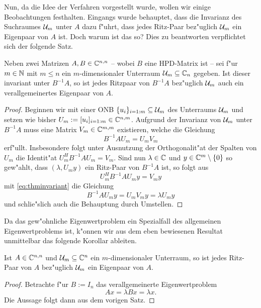 Nun, da die Idee der Verfahren vorgestellt wurde, wollen wir einige Beobachtungen
festhalten. Eingangs wurde behauptet, dass die Invarianz des Suchraumes $\mathcal{U}_m$ unter
$A$ dazu f"uhrt, dass jedes Ritz-Paar bez"uglich $\mathcal{U}_m$ ein Eigenpaar von $A$ ist.
Doch warum ist das so? Dies zu beantworten verpflichtet sich der folgende Satz.

\begin{thm}\label{thm:invariant}
Neben zwei Matrizen $A,B\in\mathbb{C}^{n,n}$ -- wobei $B$ eine HPD-Matrix ist -- sei f"ur
$m\in\mathbb{N}$ mit $m\le n$ ein $m$-dimensionaler Unterraum $\mathcal{U}_m \subseteq \mathbb{C}_n$ gegeben.
Ist dieser invariant unter $B^{-1}A$, so ist jedes Ritzpaar von $B^{-1}A$
bez"uglich $\mathcal{U}_m$ auch ein verallgemeinertes Eigenpaar von $A$.
\end{thm}

\begin{proof}
Beginnen wir mit einer ONB $\{u_i\}_{i=1:m}\subseteq\mathcal{U}_m$ des Unterraums $\mathcal{U}_m$
und setzen wie bisher $U_m := [u_i]_{i=1:m}\in\mathbb{C}^{n,m}$. Aufgrund der Invarianz
von $\mathcal{U}_m$ unter $B^{-1}A$ muss eine Matrix $V_m \in \mathbb{C}^{m,m}$ existieren, welche
die Gleichung
\begin{equation}\label{eq:thminvariant}
B^{-1}A U_m = U_m V_m
\end{equation}
erf"ullt. Insbesondere folgt unter Ausnutzung der Orthogonalit"at der Spalten
von $U_m$ die Identit"at $U_m^H B^{-1}A U_m = V_m$.
Sind nun $\lambda\in\mathbb{C}$ und $y\in\mathbb{C}^m\setminus\{0\}$ so gew"ahlt, dass $(\lambda, U_m y)$
ein Ritz-Paar von $B^{-1}A$ ist, so folgt aus
\[
U_m^H B^{-1}A U_m y = V_m y
\]
mit \eqref{eq:thminvariant} die Gleichung
\[
B^{-1}AU_m y = U_m V_m y = \lambda U_m y
\]
und schlie"slich auch die Behauptung durch Umstellen.
\end{proof}

Da das gew"ohnliche Eigenwertproblem ein Spezialfall des allgemeinen Eigenwertproblems
ist, k"onnen wir aus dem eben bewiesenen Resultat unmittelbar das folgende Korollar
ableiten.

\begin{kor}
Ist $A\in\mathbb{C}^{n,n}$ und $\mathcal{U}_m\subseteq \mathbb{C}^n$ ein $m$-dimensionaler Unterraum, so ist
jedes Ritz-Paar von $A$ bez"uglich $\mathcal{U}_m$ ein Eigenpaar von $A$.
\end{kor}

\begin{proof}
Betrachte f"ur $B:=I_n$ das verallgemeinerte Eigenwertproblem
\[
Ax = \lambda Bx = \lambda x.
\]
Die Aussage folgt dann aus dem vorigen Satz.
\end{proof}

